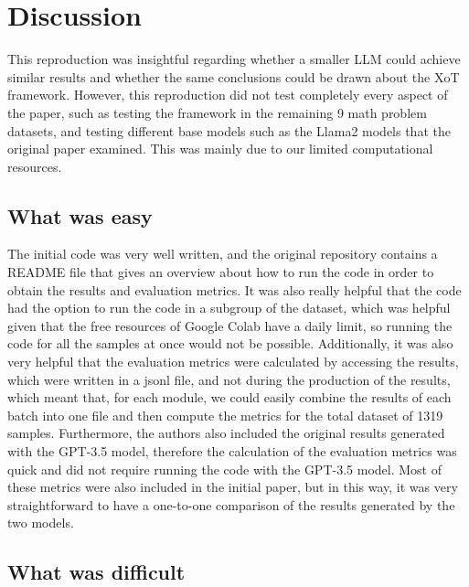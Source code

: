 \documentclass[10pt]{article} %
\begin{document}
\section{Discussion}

This reproduction was insightful regarding whether a smaller LLM could achieve similar results and whether the same conclusions could be drawn about the XoT framework. However, this reproduction did not test completely every aspect of the paper, such as testing the framework in the remaining 9 math problem datasets, and testing different base models such as the Llama2 models that the original paper examined. This was mainly due to our limited computational resources.

\subsection{What was easy}

The initial code was very well written, and the original repository contains a README file that gives an overview about how to run the code in order to obtain the results and evaluation metrics. It was also really helpful that the code had the option to run the code in a subgroup of the dataset, which was helpful given that the free resources of Google Colab have a daily limit, so running the code for all the samples at once would not be possible. Additionally, it was also very helpful that the evaluation metrics were calculated by accessing the results, which were written in a jsonl file, and not during the production of the results, which meant that, for each module, we could easily combine the results of each batch into one file and then compute the metrics for the total dataset of 1319 samples. Furthermore, the authors also included the original results generated with the GPT-3.5 model, therefore the calculation of the evaluation metrics was quick and did not require running the code with the GPT-3.5 model. Most of these metrics were also included in the initial paper, but in this way, it was very straightforward to have a one-to-one comparison of the results generated by the two models.

\subsection{What was difficult}
\end{document}
